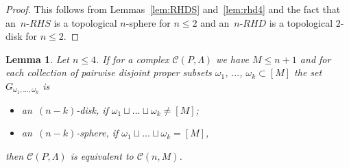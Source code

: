 \documentclass[12pt]{amsart}
\newtheorem{lemma}[formula]{Lemma}
\theoremstyle{definition}
\theoremstyle{remark}
\begin{document}
\begin{proof}
This follows from Lemmas~\ref{lem:RHDS} and~\ref{lem:rhd4}
and the fact that an~$n$-$RHS$ is a topological $n$-sphere for $n\leqslant 2$ and an~$n$-$RHD$ is a topological $2$-disk for 
$n\leqslant 2$.
\end{proof}
\begin{lemma}\label{lem:34nM}
Let $n\leqslant 4$. If for a complex $\mathcal{C}(P,\Lambda)$ we have $M\leqslant n+1$
and for each collection of pairwise disjoint proper subsets $\omega_1$, $\dots$, $\omega_k\subset[M]$ 
the set $G_{\omega_1,\dots,\omega_k}$ is 
\begin{itemize}
\item an~$(n-k)$-disk, if $\omega_1\sqcup\dots\sqcup\omega_k\ne[M]$;
\item an~$(n-k)$-sphere, if $\omega_1\sqcup\dots\sqcup\omega_k=[M]$,
\end{itemize}
then $\mathcal{C}(P,\Lambda)$ is equivalent to $\mathcal{C}(n,M)$.
\end{lemma}
\end{document}
